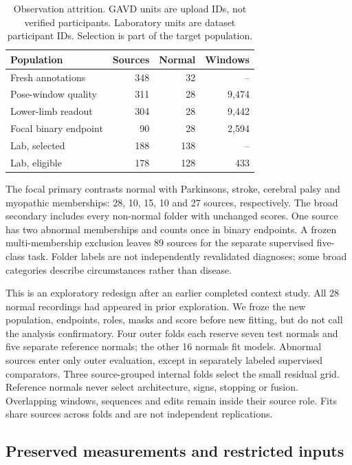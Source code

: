 \documentclass[letterpaper]{article}
\begin{document}
\begin{table}[t]
\centering
\begin{tabular}{lrrr}
\toprule
Population & Sources & Normal & Windows \\
\midrule
Fresh annotations & 348 & 32 & -- \\
Pose-window quality & 311 & 28 & 9,474 \\
Lower-limb readout & 304 & 28 & 9,442 \\
Focal binary endpoint & 90 & 28 & 2,594 \\
Lab, selected & 188 & 138 & -- \\
Lab, eligible & 178 & 128 & 433 \\
\bottomrule
\end{tabular}
\caption{Observation attrition. GAVD units are upload IDs, not verified participants. Laboratory units are dataset participant IDs. Selection is part of the target population.}
\label{tab:attrition}
\end{table}

The focal primary contrasts normal with Parkinsons, stroke, cerebral palsy and myopathic memberships: 28, 10, 15, 10 and 27 sources, respectively. The broad secondary includes every non-normal folder with unchanged scores. One source has two abnormal memberships and counts once in binary endpoints. A frozen multi-membership exclusion leaves 89 sources for the separate supervised five-class task. Folder labels are not independently revalidated diagnoses; some broad categories describe circumstances rather than disease.

This is an exploratory redesign after an earlier completed context study. All 28 normal recordings had appeared in prior exploration. We froze the new population, endpoints, roles, masks and score before new fitting, but do not call the analysis confirmatory. Four outer folds each reserve seven test normals and five separate reference normals; the other 16 normals fit models. Abnormal sources enter only outer evaluation, except in separately labeled supervised comparators. Three source-grouped internal folds select the small residual grid. Reference normals never select architecture, signs, stopping or fusion. Overlapping windows, sequences and edits remain inside their source role. Fits share sources across folds and are not independent replications.

\subsection{Preserved measurements and restricted inputs}
\end{document}
